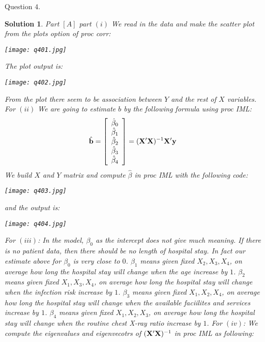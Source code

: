 \documentclass[11pt]{article}
\newtheorem{sol}{Solution}
\begin{document}
Question $4.$
\begin{sol}
	Part $[A]$\vskip 2mm
	part $(i)$\vskip 2mm
	We read in the data and make the scatter plot from the plots option of proc corr:
	\begin{center}
		\texttt{[image: q401.jpg]}
	\end{center}
	The plot output is:
	\begin{center}
		\texttt{[image: q402.jpg]}
	\end{center}
	From the plot there seem to be association between $Y$ and the rest of $X$ variables.\vskip 2mm
	For $(ii)$\vskip 2mm
	We are going to estimate $b$ by the following formula using proc IML:
	\begin{align*}
		\hat{{\bf b}} = \left[\begin{array}{c} \hat{\beta}_0\\ \hat{\beta}_1\\ \hat{\beta}_2\\ \hat{\beta}_3\\ \hat{\beta}_4\end{array}\right] = ({\bf X}'{\bf X})^{-1}{\bf X}'{\bf y}
	\end{align*}
	We build $X$ and $Y$ matrix and compute $\hat{\beta}$ in proc IML with the following code:
	\begin{center}
		\texttt{[image: q403.jpg]}
	\end{center}
	and the output is:
	\begin{center}
		\texttt{[image: q404.jpg]}
	\end{center}
	For $(iii)$:\vskip 2mm
	In the model, $\beta_0$ as the intercept does not give much meaning. If there is no patient data, then there should be no length of hospital stay. In fact our estimate above for $\beta_0$ is very close to $0$.\vskip 2mm
	$\beta_1$ means given fixed $X_2, X_3, X_4$, on average how long the hospital stay will change when the age increase by $1$.\vskip 2mm
	$\beta_2$ means given fixed $X_1, X_3, X_4$, on average how long the hospital stay will change when the infection risk increase by $1$.\vskip 2mm
	$\beta_3$ means given fixed $X_1, X_2, X_4$, on average how long the hospital stay will change when the available faciilites and services increase by $1$.\vskip 2mm
	$\beta_4$ means given fixed $X_1, X_2, X_3$, on average how long the hospital stay will change when the routine chest X-ray ratio increase by $1$.\vskip 2mm
	For $(iv)$:\vskip 2mm
	We compute the eigenvalues and eigenvecotrs of $({\bf X}'{\bf X})^{-1}$ in proc IML as following:

\end{sol}
\end{document}
